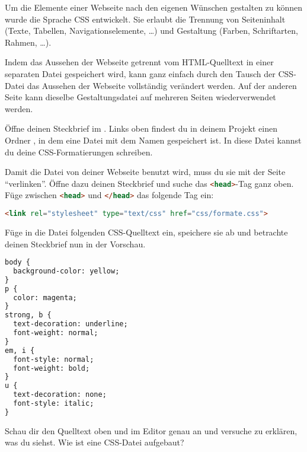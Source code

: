 \documentclass[10pt, a4paper]{arbeitsblatt}
\begin{document}
\ReiheTitel

Um die Elemente einer Webseite nach den eigenen Wünschen gestalten zu können
wurde die Sprache CSS entwickelt. Sie erlaubt die Trennung von Seiteninhalt
(Texte, Tabellen, Navigationselemente, …) und Gestaltung (Farben, Schriftarten,
Rahmen, …).

Indem das Aussehen der Webseite getrennt vom HTML-Quelltext in einer separaten
Datei gespeichert wird, kann ganz einfach durch den Tausch der CSS-Datei das
Aussehen der Webseite vollständig verändert werden. Auf der anderen Seite kann
dieselbe Gestaltungsdatei auf mehreren Seiten wiederverwendet werden.

\begin{aufgabe}[icon=\iconLaptop]
	Öffne deinen Steckbrief im . Links oben
	findest du in deinem Projekt einen Ordner , in dem eine
	Datei mit dem Namen  gespeichert ist. In diese Datei
	kannst du deine CSS-Formatierungen schreiben.

	Damit die Datei von deiner Webseite benutzt wird, muss du sie mit der Seite
	\enquote{verlinken}. Öffne dazu deinen Steckbrief und suche das
	\lstinline[language=HTML]{<head>}-Tag ganz oben. Füge zwischen \lstinline[language=HTML]{<head>} und
	\lstinline[language=HTML]{</head>} das folgende Tag ein:
	\begin{lstlisting}[language=HTML]
<link rel="stylesheet" type="text/css" href="css/formate.css">
	\end{lstlisting}
\end{aufgabe}

\begin{aufgabe}[icon=\iconLaptop]
	Füge in die Datei  folgenden
	CSS-Quelltext ein, speichere sie ab und betrachte deinen Steckbrief nun in der
	Vorschau.
	\begin{lstlisting}[language=HTML,basicstyle=\scriptsize\ttfamily]
body {
  background-color: yellow;
}
p {
  color: magenta;
}
strong, b {
  text-decoration: underline;
  font-weight: normal;
}
em, i {
  font-style: normal;
  font-weight: bold;
}
u {
  text-decoration: none;
  font-style: italic;
}
	\end{lstlisting}
\end{aufgabe}

\begin{aufgabe}[icon=\iconLaptop]
	Schau dir den Quelltext oben und im Editor genau an und
	versuche zu erklären, was du siehst. Wie ist eine CSS-Datei aufgebaut?
\end{aufgabe}
\end{document}
